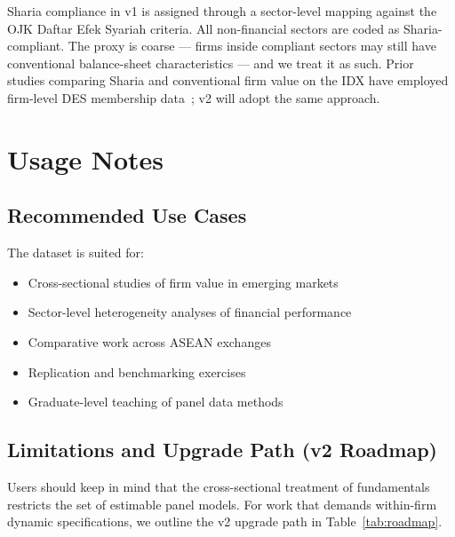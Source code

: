 \documentclass[11pt,a4paper]{article}
\begin{document}
Sharia compliance in v1 is assigned through a sector-level mapping against the OJK Daftar Efek Syariah criteria. All non-financial sectors are coded as Sharia-compliant. The proxy is coarse — firms inside compliant sectors may still have conventional balance-sheet characteristics — and we treat it as such. Prior studies comparing Sharia and conventional firm value on the IDX have employed firm-level DES membership data~\cite{pratiwi2021,rahayu2025}; v2 will adopt the same approach.

\section{Usage Notes}

\subsection{Recommended Use Cases}

The dataset is suited for:
\begin{itemize}[leftmargin=*,nosep]
\item Cross-sectional studies of firm value in emerging markets
\item Sector-level heterogeneity analyses of financial performance
\item Comparative work across ASEAN exchanges
\item Replication and benchmarking exercises
\item Graduate-level teaching of panel data methods
\end{itemize}

\subsection{Limitations and Upgrade Path (v2 Roadmap)}

Users should keep in mind that the cross-sectional treatment of fundamentals restricts the set of estimable panel models. For work that demands within-firm dynamic specifications, we outline the v2 upgrade path in Table~\ref{tab:roadmap}.
\end{document}
